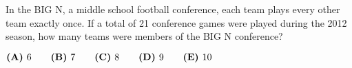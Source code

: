 

In the BIG N, a middle school football conference, each team plays every other team exactly once. If a total of 21 conference games were played during the 2012 season, how many teams were members of the BIG N conference?

$\textbf{(A)}\hspace{.05in}6 \qquad \textbf{(B)}\hspace{.05in}7 \qquad \textbf{(C)}\hspace{.05in}8 \qquad \textbf{(D)}\hspace{.05in}9 \qquad \textbf{(E)}\hspace{.05in}10 $
